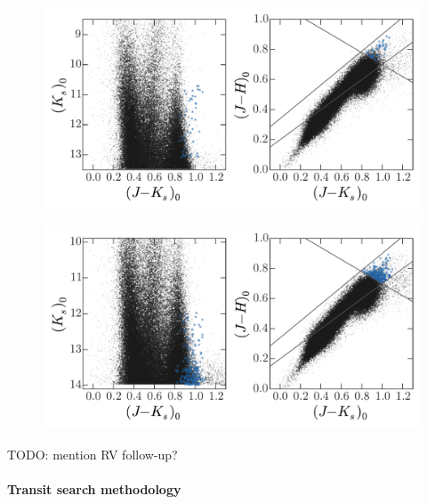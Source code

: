 \documentclass[letterpaper,12pt,preprint]{hack_aastex}
\begin{document}
\begin{figure}[p]
\begin{center}
\includegraphics[width=\textwidth]{fig1.pdf}
\caption{} 
\label{fig:field8}
\end{center}
\end{figure}

\begin{figure}[p]
\begin{center}
\includegraphics[width=\textwidth]{fig2.pdf}
\caption{} 
\label{fig:field10}
\end{center}
\end{figure}

TODO: mention RV follow-up?


\paragraph{Transit search methodology}
\end{document}
